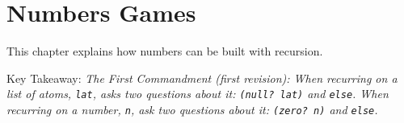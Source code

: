 \documentclass[11pt]{article}
\begin{document}
\newpage

\section{Numbers Games}
\label{sec:orgc5c27d9}

This chapter explains how numbers can be built with recursion.

\vspace{1em}

Key Takeaway:
\emph{The First Commandment (first revision): When recurring on a list of atoms, \texttt{lat}, asks two questions about it: \texttt{(null? lat)} and \texttt{else}. When
recurring on a number, \texttt{n}, ask two questions about it: \texttt{(zero? n)} and \texttt{else}.}


\vspace{1em}
\end{document}
